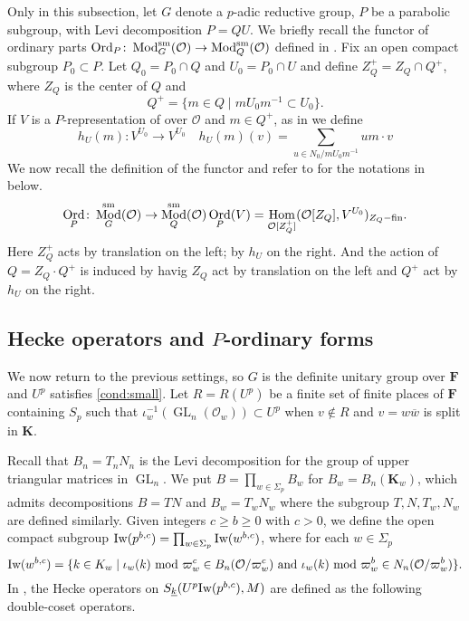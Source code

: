 \documentclass[leqno]{amsart}
\theoremstyle{definition}
\theoremstyle{remark}
\newcommand{\oo}{\mathcal{O}}
\DeclareMathOperator{\Hom}{Hom}
\DeclareMathOperator{\GL}{GL}
\DeclareMathOperator{\Mod}{\textnormal{Mod}}
\DeclareMathOperator{\Ord}{Ord} %
\newcommand{\sm}{\textnormal{sm}}
\newcommand{\fin}{\textnormal{fin}}
\newcommand{\F}{{\mathbf{F}}} %
\newcommand{\K}{{\mathbf{K}}} %
\newcommand{\bw}{\overline{w}}
\newcommand{\wt}[1]{\underline{ #1 }}
\newcommand{\Iw}{\textnormal{Iw}} %
\begin{document}
Only in this subsection,
let $G$ denote a  $p$-adic reductive group,
$P$ be a parabolic subgroup,
with Levi decomposition $P=QU$.
We briefly recall the functor
of ordinary parts 
$\Ord_P\colon \Mod_G^{\sm}(\oo)\to \Mod_Q^{\sm}(\oo)$
defined in \cite{emeI}.
Fix an open compact subgroup $P_0\subset P$.
Let  $Q_0=P_0\cap Q$ and $U_0=P_0\cap U$
and define $Z_Q^+=Z_Q\cap Q^+$,
where  $Z_Q$ is the center of $Q$ and
\[
	Q^+=\{m\in Q\mid mU_0m^{-1}\subset U_0\}.
\]
If  $V$ is a $P$-representation of over $\oo$
and  $m\in Q^+$,
as in \cite[Def 3.1.3]{emeI} we define
\begin{equation}\label{def:hUm}
	 h_{U}(m)\colon V^{U_0}\to V^{U_0}\quad
	 h_{U}(m)(v)=\sum_{u\in N_0/m U_0 m^{-1}}um\cdot v
\end{equation}
We now recall the definition of the functor
and refer to \cite[Def 3.1.3]{emeI}
for the notations in below.
\begin{equation}\label{def:OrdP}
	\Ord_P\colon \Mod_G^{\sm}(\oo)\to \Mod_Q^{\sm}(\oo)
	\Ord_P(V)=\Hom_{\oo[Z_Q^+]}(\oo[Z_Q], V^{U_0})_{Z_Q-\fin}.
\end{equation}
Here $Z_Q^+$ acts by translation on the left; 
by $h_U$ on the right.
And the action of $Q=Z_Q\cdot Q^+$ is induced by 
havig $Z_Q$ act by translation on the left and 
$Q^+$ act by $h_U$ on the right.

\subsection{Hecke operators and $P$-ordinary forms}

We now return to the previous settings,
so $G$ is the definite unitary group over $\F$
and  $U^p$ satisfies \eqref{cond:small}.
Let $R=R(U^p)$ be a finite set of
finite places of $\F$ containing $S_p$ such that
$\iota_w^{-1}(\GL_n(\oo_w))\subset U^p$
when  $v\notin R$
and  $v=w\bw$ is split in  $\K$.

Recall that $B_n=T_nN_n$ is the Levi decomposition
for the group of upper triangular matrices in  $\GL_n$.
We put $B=\prod_{w\in \Sigma_p}B_w$
for $B_w=B_n(\K_w)$,
which admits decompositions 
$B=TN$ and  $B_w=T_wN_w$
where the subgroup  $T, N, T_w, N_w$ are defined similarly.
Given integers $c\geq b\geq 0$ with  $c>0$, 
we define 
the open compact subgroup 
$\Iw(p^{b,c})=\prod_{w\in \Sigma_p}\Iw(w^{b,c})$, where 
for each $w\in \Sigma_p$
\begin{equation}\label{def:Iwahori}
	\Iw(w^{b,c})=\{
	k\in K_w\mid 
	\iota_w(k) \text{ mod } \varpi_w^c \in B_n(\oo/\varpi_w^c)
	\text{ and }
	\iota_w(k) \text{ mod } \varpi_w^b \in N_n(\oo/\varpi_w^b)
	\}.
\end{equation}
In \cite{ger},
the Hecke operators on $S_{\wt{k}}(U^p\Iw(p^{b,c}),M)$
are defined as the following double-coset operators.
\end{document}
